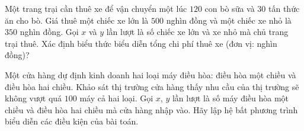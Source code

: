 \begin{vd}%
	Một trang trại cần thuê xe để vận chuyển một lúc $120$ con bò sữa và $30$ tấn thức ăn cho bò. Giá thuê một chiếc xe lớn là $500$ nghìn đồng và một chiếc xe nhỏ là $350$ nghìn đồng. Gọi $x$ và $y$ lần lượt là số chiếc xe lớn và xe nhỏ mà chủ trang trại thuê. Xác định biểu thức biểu diễn tổng chi phí thuê xe (đơn vị: nghìn đồng)?
\end{vd}
\begin{vd}%
	Một cửa hàng dự định kinh doanh hai loại máy điều hòa: điều hòa một chiều và điều hòa hai chiều. Khảo sát thị trường cửa hàng thấy nhu cầu của thị trường sẽ không vượt quá $100$ máy cả hai loại. Gọi $x$, $y$ lần lượt là số máy điều hòa một chiều và điều hòa hai chiều mà cửa hàng nhập vào. Hãy lập hệ bất phương trình biểu diễn các điều kiện của bài toán.
\end{vd}
